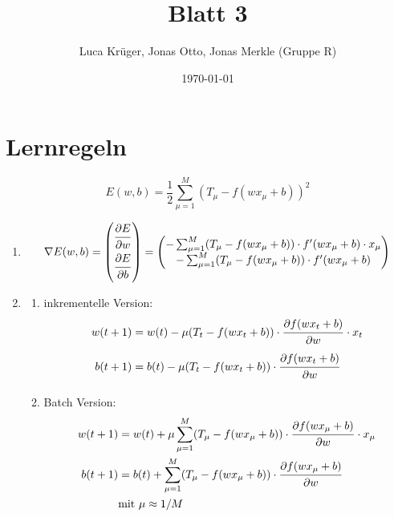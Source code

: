\documentclass{article}
\title{Blatt 3}
\author{Luca Krüger, Jonas Otto, Jonas Merkle (Gruppe R)}
\date{\today}
\begin{document}
\maketitle

\section{Lernregeln}
$$E(w,b)=\frac{1}{2}\sum_{\mu=1}^{M}(T_{\mu}-f(wx_{\mu}+b))^2$$
\begin{enumerate}
  \item
        \begin{align*}
          \nabla E(w,b)=\begin{pmatrix} \dfrac{\strut \partial E}{\strut \partial w} \\ \dfrac{\strut \partial E}{\strut \partial b}\end{pmatrix} = \begin{pmatrix}
            - \sum_{\mu=1}^{M}(T_{\mu}-f(wx_{\mu}+b)) \cdot f'(wx_{\mu}+b)\cdot x_{\mu} \\
            - \sum_{\mu=1}^{M}(T_{\mu}-f(wx_{\mu}+b)) \cdot f'(wx_{\mu}+b)
          \end{pmatrix} \\
        \end{align*}
  \item
        \begin{enumerate}[label=\alph*)]
          \item inkrementelle Version:
                \begin{align*}
                  w(t+1) & =w(t)-\mu(T_{t}-f(wx_{t}+b)) \cdot \dfrac{\strut \partial f(wx_{t}+b)}{\strut \partial w}\cdot x_t \\
                  b(t+1) & =b(t)-\mu(T_{t}-f(wx_{t}+b)) \cdot \dfrac{\strut \partial f(wx_{t}+b)}{\strut \partial w}
                \end{align*}
          \item Batch Version:
                \begin{align*}
                  w(t+1) & =w(t)+\mu\sum_{\mu=1}^{M}(T_{\mu}-f(wx_{\mu}+b)) \cdot \dfrac{\strut \partial f(wx_{\mu}+b)}{\strut \partial w}\cdot x_{\mu} \\
                  b(t+1) & =b(t)+\sum_{\mu=1}^{M}(T_{\mu}-f(wx_{\mu}+b)) \cdot \dfrac{\strut \partial f(wx_{\mu}+b)}{\strut \partial w}                 \\
                         & \text{mit}\ \mu \approx 1/M

\end{align*}
\end{enumerate}
\end{enumerate}
\end{document}
